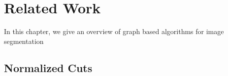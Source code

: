 \chapter{Related Work} \label{ch:reated_work}

In this chapter, we give an overview of graph based algorithms
for image segmentation 

 

 

 

 

 

 



\section{Normalized Cuts}


